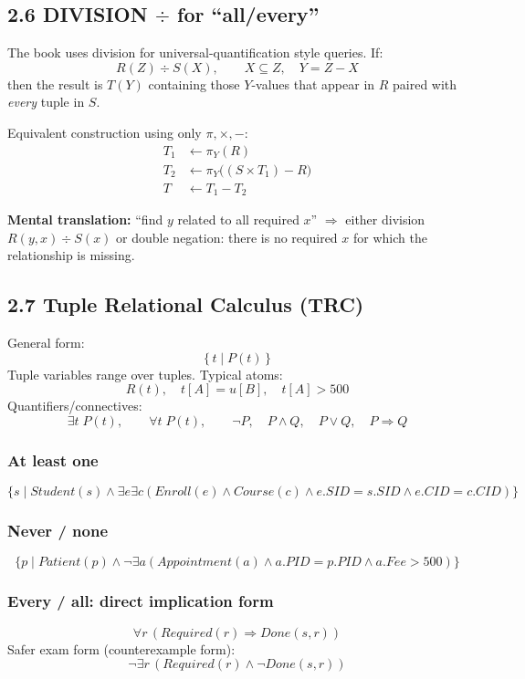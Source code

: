\documentclass[10pt,a4paper]{article}
\begin{document}
\subsection{2.6 DIVISION $\div$ for ``all/every''}
The book uses division for universal-quantification style queries. If:
\[
R(Z)\div S(X),\qquad X\subseteq Z,\quad Y=Z-X
\]
then the result is $T(Y)$ containing those $Y$-values that appear in $R$ paired with \emph{every} tuple in $S$.

Equivalent construction using only $\pi,\times,-$:
\begin{align*}
T_1 &\leftarrow \pi_Y(R)\\
T_2 &\leftarrow \pi_Y\big((S\times T_1)-R\big)\\
T &\leftarrow T_1-T_2
\end{align*}

\begin{examanswer}
\textbf{Mental translation:} ``find $y$ related to all required $x$'' $\Rightarrow$ either division $R(y,x)\div S(x)$ or double negation: there is no required $x$ for which the relationship is missing.
\end{examanswer}

\subsection{2.7 Tuple Relational Calculus (TRC)}
General form:
\[
\boxed{\{\,t\mid P(t)\,\}}
\]
Tuple variables range over tuples. Typical atoms:
\[
R(t),\quad t[A]=u[B],\quad t[A]>500
\]
Quantifiers/connectives:
\[
\exists t\;P(t),\qquad \forall t\;P(t),\qquad \neg P,\quad P\land Q,\quad P\lor Q,\quad P\Rightarrow Q
\]

\subsubsection*{At least one}
\[
\{s\mid Student(s)\land \exists e\exists c(Enroll(e)\land Course(c)\land e.SID=s.SID\land e.CID=c.CID)\}
\]

\subsubsection*{Never / none}
\[
\{p\mid Patient(p)\land \neg\exists a(Appointment(a)\land a.PID=p.PID\land a.Fee>500)\}
\]

\subsubsection*{Every / all: direct implication form}
\[
\forall r\,(Required(r)\Rightarrow Done(s,r))
\]
Safer exam form (counterexample form):
\[
\boxed{\neg\exists r\,(Required(r)\land \neg Done(s,r))}
\]
\end{document}
